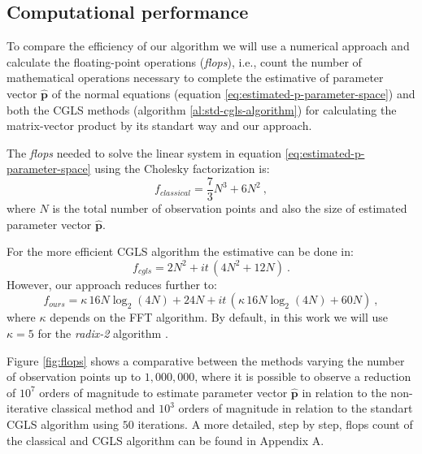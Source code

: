 \subsection{Computational performance}

To compare the efficiency of our algorithm we will use a numerical approach and calculate the floating-point operations (\emph{flops}), i.e., count the number of mathematical operations necessary to complete the estimative of parameter vector $\mathbf{\hat{p}}$ of the normal equations (equation \ref{eq:estimated-p-parameter-space}) and both the CGLS methods (algorithm \ref{al:std-cgls-algorithm}) for calculating the matrix-vector product by its standart way and our approach.

The \emph{flops} needed to solve the linear system in equation \ref{eq:estimated-p-parameter-space} using the Cholesky factorization is:
\begin{equation}
f_{classical} =  \dfrac{7}{3} N^{3} + 6 N^{2}\: ,
\label{eq:flops-normal-cholesky}
\end{equation}
where $N$ is the total number of observation points and also the size of estimated parameter vector $\mathbf{\hat{p}}$.

For the more efficient CGLS algorithm the estimative can be done in:
\begin{equation}
f_{cgls} =  2 N^{2} + it \, (4 N^{2} + 12 N) \: .
\label{eq:flops-cgls}
\end{equation}
However, our approach reduces further to:
\begin{equation}
f_{ours} =  \kappa  \, 16 N \log_2(4 N) + 24 N + it \, (\kappa  \, 16 N \log_2 (4 N) + 60 N) \: ,
\label{eq:flops-cgls-bccb}
\end{equation}
where $\kappa$ depends on the FFT algorithm. By default, in this work we will use $\kappa = 5$ for the \emph{radix-2} algorithm \citep{vanloan1992}.

Figure \ref{fig:flops} shows a comparative between the methods varying the number of observation points up to $1,000,000$, where it is possible to observe a reduction of $10^7$ orders of magnitude to estimate parameter vector $\mathbf{\hat{p}}$ in relation to the non-iterative classical method and $10^3$ orders of magnitude in relation to the standart CGLS algorithm using $50$ iterations. A more detailed, step by step, flops count of the classical and CGLS algorithm can be found in Appendix A.

